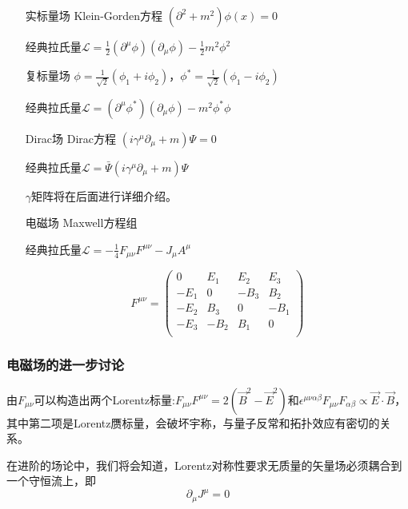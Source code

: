 \begin{itemize}
    \item[实标量场] Klein-Gorden方程 $(\partial^2+m^2)\phi(x)=0$

        经典拉氏量$\mathcal{L}=\frac{1}{2}(\partial^\mu\phi)(\partial_\mu\phi)-\frac{1}{2}m^2\phi^2$

    \item[复标量场] $\phi=\frac{1}{\sqrt{2}}(\phi_1+i\phi_2)$，$\phi^*=\frac{1}{\sqrt{2}}(\phi_1-i\phi_2)$
        
        经典拉氏量$\mathcal{L}=(\partial^\mu\phi^*)(\partial_\mu\phi)-m^2\phi^*\phi$
        
    \item[Dirac场] Dirac方程 $(i\gamma^\mu\partial_\mu+m)\Psi=0$
    
        经典拉氏量$\mathcal{L}=\bar{\Psi}(i\gamma^\mu\partial_\mu+m)\Psi$

        $\gamma$矩阵将在后面进行详细介绍。

    \item[电磁场] Maxwell方程组
    
        经典拉氏量$\mathcal{L}=-\frac{1}{4}F_{\mu\nu}F^{\mu\nu}-J_\mu A^\mu$
        
        \begin{equation}
            F^{\mu\nu}=\left(\begin{matrix}
                0 & E_1 & E_2 & E_3 \\
                -E_1 & 0 & -B_3 & B_2 \\
                -E_2 & B_3 & 0 & -B_1 \\
                -E_3 & -B_2 & B_1 & 0 \\
            \end{matrix}\right)
        \end{equation}

\end{itemize}

\subsubsection{电磁场的进一步讨论}

由$F_{\mu\nu}$可以构造出两个Lorentz标量:$F_{\mu\nu}F^{\mu\nu}=2(\vec{B}^2-\vec{E}^2)$和$\epsilon^{\mu\nu\alpha\beta}F_{\mu\nu}F_{\alpha\beta}\propto\vec{E}\cdot\vec{B}$，其中第二项是Lorentz赝标量，会破坏宇称，与量子反常和拓扑效应有密切的关系。

在进阶的场论中，我们将会知道，Lorentz对称性要求无质量的矢量场必须耦合到一个守恒流上，即
\begin{equation}
    \partial_\mu J^\mu=0
\end{equation}

